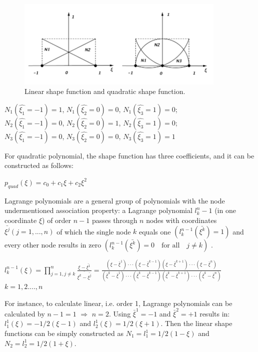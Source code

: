 \begin{figure}
	\begin{center}
		\includegraphics[width=10cm,clip]{shape_func.pdf} 		
		\caption{Linear shape function and quadratic shape function.} \label{fig: shape_func}	
	\end{center}
\end{figure}

\begin{center}
	$N_1\left(\hat{\xi_1} = -1\right) = 1$, $N_1\left(\hat{\xi_2} = 0\right) = 0$, $N_1\left(\hat{\xi_3} = 1\right) = 0$;\\
	$N_2\left(\hat{\xi_1} = -1\right) = 0$, $N_2\left(\hat{\xi_2} = 0\right) = 1$, $N_2\left(\hat{\xi_3} = 1\right) = 0$;\\
	$N_3\left(\hat{\xi_1} = -1\right) = 0$, $N_3\left(\hat{\xi_2} = 0\right) = 0$, $N_3\left(\hat{\xi_3} = 1\right) = 1$
\end{center}
For quadratic polynomial, the shape function has three coefficients, and it can be constructed as follows:
\begin{center}
	$p_{quad}\left(\xi\right) = c_0 + c_1\xi + c_2\xi^2$
\end{center}

Lagrange polynomials are a general group of polynomials with the node undermentioned association property: a Lagrange polynomial $l_k^n-1$ (in one coordinate $\xi$) of order $n-1$ passes through $n$ nodes with coordinates $\bar{\xi^j}\left(j = 1,...,n\right)$ of which the single node $k$ equals one $\left(l_k^{n-1} \left(\bar{\xi^k}\right)=1\right)$ and every other node results in zero $\left(l_k^{n-1} \left(\bar{\xi^k}\right)=0  \quad \text{for all} \quad j \neq k\right)$ .

\begin{center}
	$l_k^{n-1} \left( \xi \right) = \prod_{j = 1, j \neq k}^{n} \frac{\xi - \bar{\xi^1}}{\bar{\xi^k - \bar{\xi^j}}} = \frac{\left(\xi - \bar{\xi}^1\right)\cdot\cdot\cdot \left( \xi - \bar{\xi}^{k-1}\right) \left(\xi - \bar{\xi}^{k+1}\right)\cdot\cdot\cdot \left(\xi -\bar{\xi}^n\right)}{\left(\bar{\xi}^k - \bar{\xi}^1\right)\cdot\cdot\cdot \left( \bar{\xi}^k - \bar{\xi}^{k-1}\right) \left(\bar{\xi}^k - \bar{\xi}^{k+1}\right)\cdot\cdot\cdot \left(\bar{\xi}^k -\bar{\xi}^n\right)}$ \\[4mm] \quad $k = 1,2....,n$
\end{center}
For instance, to calculate linear, i.e. order 1, Lagrange polynomials can be calculated by $n-1=1$ $\Rightarrow$ $n=2$. Using $\bar{\xi}^1 = -1$ and $\bar{\xi}^2 = +1$ results in: $l_1^1\left(\xi\right) = -1/2\left(\xi - 1\right)$ and $l_2^1\left(\xi\right) = 1/2\left(\xi + 1\right)$.
Then the linear shape functions can be simply constructed as $N_1 =l_1^1 = 1/2\left(1-\xi\right)$ and $N_2 = l_2^1 = 1/2\left(1+\xi\right)$.

